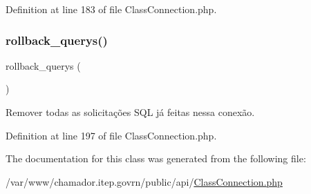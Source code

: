 Definition at line 183 of file Class\+Connection.\+php.

\mbox{\label{class_class_connection_a278a7a9ce9d5327bf2af66959d9bc723}} 
\subsubsection{\texorpdfstring{rollback\+\_\+querys()}{rollback\_querys()}}
{\footnotesize\ttfamily rollback\+\_\+querys (\begin{DoxyParamCaption}{ }\end{DoxyParamCaption})}



Remover todas as solicitações S\+QL já feitas nessa conexão. 



Definition at line 197 of file Class\+Connection.\+php.



The documentation for this class was generated from the following file\+:\begin{DoxyCompactItemize}
\item 
/var/www/chamador.\+itep.\+govrn/public/api/\hyperlink{_class_connection_8php}{Class\+Connection.\+php}\end{DoxyCompactItemize}
